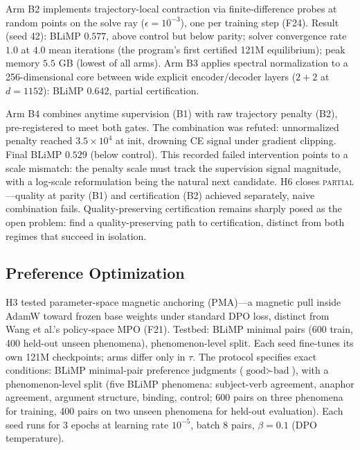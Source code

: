 Arm B2 implements trajectory-local contraction via finite-difference probes at random points on the solve ray ($\epsilon = 10^{-3}$), one per training step (F24). Result (seed 42): BLiMP $0.577$, above control but below parity; solver convergence rate $1.0$ at $4.0$ mean iterations (the program's first certified 121M equilibrium); peak memory $5.5$ GB (lowest of all arms). Arm B3 applies spectral normalization to a 256-dimensional core between wide explicit encoder/decoder layers ($2+2$ at $d=1152$): BLiMP $0.642$, partial certification.

Arm B4 combines anytime supervision (B1) with raw trajectory penalty (B2), pre-registered to meet both gates. The combination was refuted: unnormalized penalty reached $3.5 \times 10^4$ at init, drowning CE signal under gradient clipping. Final BLiMP $0.529$ (below control). This recorded failed intervention points to a scale mismatch: the penalty scale must track the supervision signal magnitude, with a log-scale reformulation being the natural next candidate. H6 closes \textsc{partial}---quality at parity (B1) and certification (B2) achieved separately, naive combination fails. Quality-preserving certification remains sharply posed as the open problem: find a quality-preserving path to certification, distinct from both regimes that succeed in isolation.

\subsection{Preference Optimization}
\label{sec:results:mpo}
\label{sec:mpo}

H3 tested parameter-space magnetic anchoring (PMA)---a magnetic pull inside AdamW toward frozen base weights under standard DPO loss, distinct from Wang et al.'s policy-space MPO (F21). Testbed: BLiMP minimal pairs (600 train, 400 held-out unseen phenomena), phenomenon-level split. Each seed fine-tunes its own 121M checkpoints; arms differ only in $\tau$. The protocol specifies exact conditions: BLiMP minimal-pair preference judgments ($\text{good} \succ \text{bad}$), with a phenomenon-level split (five BLiMP phenomena: subject-verb agreement, anaphor agreement, argument structure, binding, control; 600 pairs on three phenomena for training, 400 pairs on two unseen phenomena for held-out evaluation). Each seed runs for 3 epochs at learning rate $10^{-5}$, batch 8 pairs, $\beta = 0.1$ (DPO temperature).

